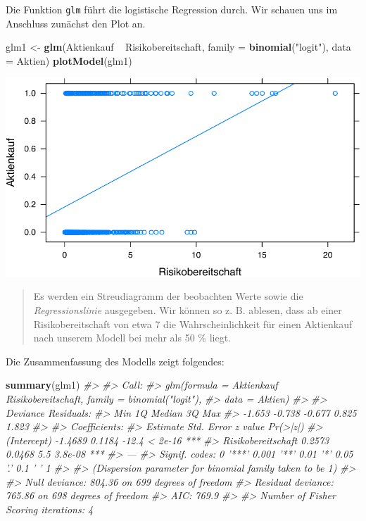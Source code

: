 \documentclass[12pt,]{book}
\newenvironment{Shaded}{\begin{snugshade}}{\end{snugshade}}
\newcommand{\KeywordTok}[1]{\textcolor[rgb]{0.13,0.29,0.53}{\textbf{{#1}}}}
\newcommand{\DataTypeTok}[1]{\textcolor[rgb]{0.13,0.29,0.53}{{#1}}}
\newcommand{\StringTok}[1]{\textcolor[rgb]{0.31,0.60,0.02}{{#1}}}
\newcommand{\CommentTok}[1]{\textcolor[rgb]{0.56,0.35,0.01}{\textit{{#1}}}}
\newcommand{\NormalTok}[1]{{#1}}
\begin{document}
Die Funktion \texttt{glm} führt die logistische Regression durch. Wir
schauen uns im Anschluss zunächst den Plot an.

\begin{Shaded}
\begin{Highlighting}[]
\NormalTok{glm1 <-}\StringTok{ }\KeywordTok{glm}\NormalTok{(Aktienkauf ~}\StringTok{ }\NormalTok{Risikobereitschaft, }\DataTypeTok{family =} \KeywordTok{binomial}\NormalTok{(}\StringTok{"logit"}\NormalTok{),}
            \DataTypeTok{data =} \NormalTok{Aktien)}
\KeywordTok{plotModel}\NormalTok{(glm1)}
\end{Highlighting}
\end{Shaded}

\begin{center}\includegraphics[width=0.7\linewidth]{072_klassifizierende_Regression_files/figure-latex/unnamed-chunk-7-1} \end{center}

\begin{quote}
Es werden ein Streudiagramm der beobachten Werte sowie die
\emph{Regressionslinie} ausgegeben. Wir können so z. B. ablesen, dass ab
einer Risikobereitschaft von etwa 7 die Wahrscheinlichkeit für einen
Aktienkauf nach unserem Modell bei mehr als 50 \% liegt.
\end{quote}

Die Zusammenfassung des Modells zeigt folgendes:

\begin{Shaded}
\begin{Highlighting}[]
\KeywordTok{summary}\NormalTok{(glm1)}
\CommentTok{#> }
\CommentTok{#> Call:}
\CommentTok{#> glm(formula = Aktienkauf ~ Risikobereitschaft, family = binomial("logit"), }
\CommentTok{#>     data = Aktien)}
\CommentTok{#> }
\CommentTok{#> Deviance Residuals: }
\CommentTok{#>    Min      1Q  Median      3Q     Max  }
\CommentTok{#> -1.653  -0.738  -0.677   0.825   1.823  }
\CommentTok{#> }
\CommentTok{#> Coefficients:}
\CommentTok{#>                    Estimate Std. Error z value Pr(>|z|)    }
\CommentTok{#> (Intercept)         -1.4689     0.1184   -12.4  < 2e-16 ***}
\CommentTok{#> Risikobereitschaft   0.2573     0.0468     5.5  3.8e-08 ***}
\CommentTok{#> ---}
\CommentTok{#> Signif. codes:  0 '***' 0.001 '**' 0.01 '*' 0.05 '.' 0.1 ' ' 1}
\CommentTok{#> }
\CommentTok{#> (Dispersion parameter for binomial family taken to be 1)}
\CommentTok{#> }
\CommentTok{#>     Null deviance: 804.36  on 699  degrees of freedom}
\CommentTok{#> Residual deviance: 765.86  on 698  degrees of freedom}
\CommentTok{#> AIC: 769.9}
\CommentTok{#> }
\CommentTok{#> Number of Fisher Scoring iterations: 4}
\end{Highlighting}
\end{Shaded}
\end{document}
